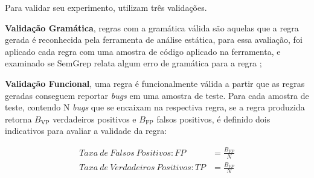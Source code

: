 \documentclass[
    12pt,                %
    openright,           %
    oneside,             %
    a4paper,             %
    english,             %
    brazil               %
]{abntex2}
\begin{document}
\par
Para validar seu experimento,  utilizam três validações.
\par
\textbf{Validação Gramática}, regras com a gramática válida são aquelas que a regra gerada é reconhecida pela ferramenta de análise estática, para essa avaliação, foi aplicado cada regra com uma amostra de código aplicado na ferramenta, e examinado se SemGrep relata algum erro de gramática para a regra \cite{hou2025generation};
\par 
\textbf{Validação Funcional}, uma regra é funcionalmente válida a partir que as regras geradas conseguem reportar \textit{bugs} em uma amostra de teste.
Para cada amostra de teste, contendo N \textit{bugs} que se encaixam na respectiva regra, se a regra produzida retorna $B_{\text{VP}}$ verdadeiros positivos e $B_{\text{FP}}$ falsos positivos, é definido dois indicativos para avaliar a validade da regra: \cite{hou2025generation}

\begin{align}
    Taxa\ de\ Falsos\ Positivos : FP &= \frac{B_{FP}}{N} \\
    Taxa\ de\ Verdadeiros\ Positivos : TP &= \frac{B_{VP}}{N}
\end{align}
\end{document}
